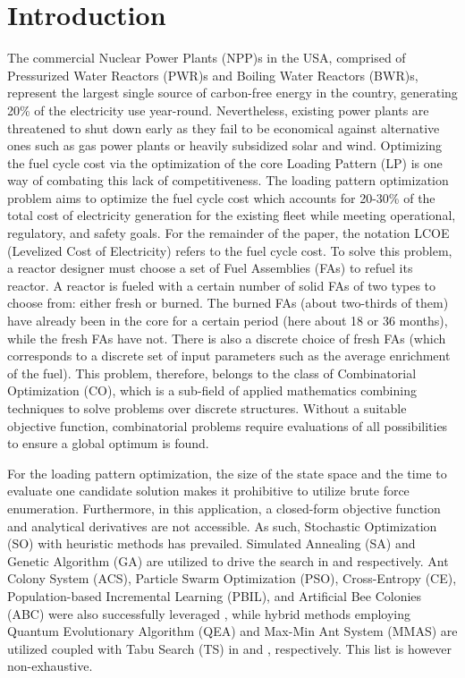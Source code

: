 \documentclass[a4paper]{article}
\begin{document}
\section{Introduction} 
\label{sec:intro}
The commercial Nuclear Power Plants (NPP)s in the USA, comprised of Pressurized Water Reactors (PWR)s and Boiling Water Reactors (BWR)s, represent the largest single source of carbon-free energy in the country, generating 20\% of the electricity use year-round. Nevertheless, existing power plants are threatened to shut down early as they fail to be economical against alternative ones such as gas power plants or heavily subsidized solar and wind. Optimizing the fuel cycle cost via the optimization of the core Loading Pattern (LP) is one way of combating this lack of competitiveness. The loading pattern optimization problem aims to optimize the fuel cycle cost which accounts for 20-30\% of the total cost of electricity generation for the existing fleet \cite{nei2020nuclear} while meeting operational, regulatory, and safety goals. For the remainder of the paper, the notation LCOE (Levelized Cost of Electricity) refers to the fuel cycle cost. To solve this problem, a reactor designer must choose a set of Fuel Assemblies (FAs) to refuel its reactor. A reactor is fueled with a certain number of solid FAs of two types to choose from: either fresh or burned.  The burned FAs (about two-thirds of them) have already been in the core for a certain period (here about 18 or 36 months), while the fresh FAs have not. There is also a discrete choice of fresh FAs (which corresponds to a discrete set of input parameters such as the average enrichment of the fuel). This problem, therefore, belongs to the class of Combinatorial Optimization (CO), which is a sub-field of applied mathematics combining techniques to solve problems over discrete structures. Without a suitable objective function, combinatorial problems require evaluations of all possibilities to ensure a global optimum is found. 

For the loading pattern optimization, the size of the state space and the time to evaluate one candidate solution makes it prohibitive to utilize brute force enumeration. Furthermore, in this application, a closed-form objective function and analytical derivatives are not accessible. As such, Stochastic Optimization (SO) with heuristic methods has prevailed.  Simulated Annealing (SA) and Genetic Algorithm (GA) are utilized to drive the search in \cite{kropaczek2011copernicus,park2009multiobjective} and \cite{parks1996multiobjective} respectively. Ant Colony System (ACS), Particle Swarm Optimization (PSO), Cross-Entropy (CE), Population-based Incremental Learning (PBIL), and Artificial Bee Colonies (ABC) were also successfully leveraged \cite{moura2019optimization,meneses2015acrossentropy,lima2008anuclear}, while hybrid methods employing Quantum Evolutionary Algorithm (QEA) and Max-Min Ant System (MMAS) are utilized coupled with Tabu Search (TS) in \cite{wu2016quantum} and \cite{lin2014themaxmin}, respectively. This list is however non-exhaustive.
\end{document}
